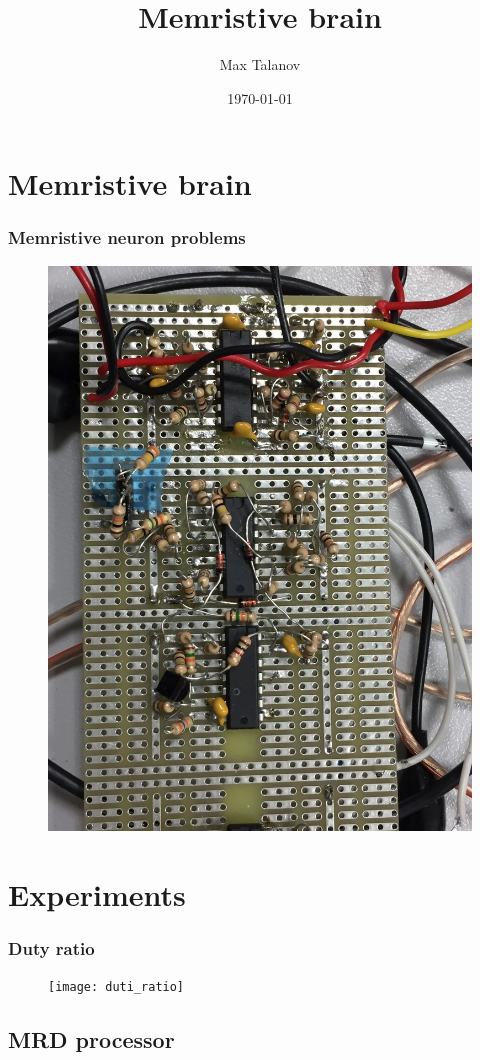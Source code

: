 \documentclass[12pt, aspectratio=169]{beamer}
\title[Memristive brain]{Memristive brain} %
\author[Max Talanov]{
  Max Talanov
}
\institute[Neurolab: KFU]%
{
Neuro-biology lab /ITIS, KFU \\ %
\medskip
\textit{max.talanov@gmail.com} %
}
\date{\today} %
\begin{document}
\begin{frame}
\titlepage %
\end{frame}


\section{Memristive brain}

\begin{frame}
  \frametitle{Memristive neuron problems}
  \begin{figure}
    \includegraphics[width=0.4\linewidth, angle=90]{board}
  \end{figure}
\end{frame}

\section{Experiments}

\begin{frame}
  \frametitle{Duty ratio}
\begin{figure}
\texttt{[image: duti\_ratio]}
\end{figure}
\end{frame}

\subsection{MRD processor}
\end{document}
